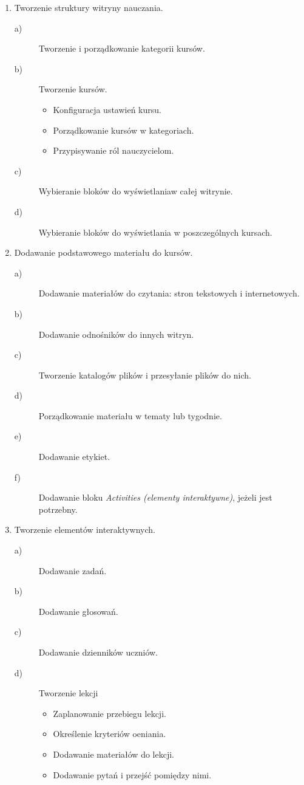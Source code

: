 \begin{enumerate}
	\item Tworzenie struktury witryny nauczania.
	\begin{description}
		\item[a)] Tworzenie i porządkowanie kategorii kursów.
		\item[b)] Tworzenie kursów.
		\begin{itemize}
			\item Konfiguracja ustawień kursu.
			\item Porządkowanie kursów w kategoriach.
			\item Przypisywanie ról nauczycielom.
		\end{itemize}
		\item[c)] Wybieranie bloków do wyświetlaniaw całej witrynie.
		\item[d)] Wybieranie bloków do wyświetlania w poszczególnych kursach.
	\end{description}
	\item Dodawanie podstawowego materiału do kursów.
		\begin{description}
			\item[a)] Dodawanie materiałów do czytania: stron tekstowych i internetowych.
			\item[b)] Dodawanie odnośników do innych witryn.
			\item[c)] Tworzenie katalogów plików i przesyłanie plików do nich.
			\item[d)] Porządkowanie materiału w tematy lub tygodnie.
			\item[e)] Dodawanie etykiet.
			\item[f)] Dodawanie bloku \textit{Activities (elementy interaktywne)}, jeżeli jest potrzebny.
		\end{description}
	\item Tworzenie elementów interaktywnych.
		\begin{description}
			\item[a)] Dodawanie zadań.
			\item[b)] Dodawanie głosowań.
			\item[c)] Dodawanie dzienników uczniów.
			\item[d)] Tworzenie lekcji
			\begin{itemize}
				\item Zaplanowanie przebiegu lekcji.
				\item Określenie kryteriów oeniania.
				\item Dodawanie materiałów do lekcji.
				\item Dodawanie pytań i przejść pomiędzy nimi.

\end{itemize}
\end{description}
\end{enumerate}
